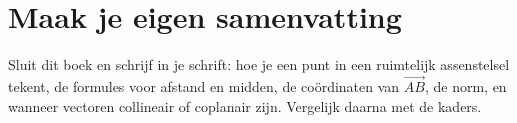 \begin{oefeningen}






\end{oefeningen}


\ifzelfstudie
\section*{Maak je eigen samenvatting}
Sluit dit boek en schrijf in je schrift: hoe je een punt in een ruimtelijk assenstelsel tekent, de formules voor afstand en midden, de coördinaten van $\overrightarrow{AB}$, de norm, en wanneer vectoren collineair of coplanair zijn. Vergelijk daarna met de kaders.
\fi
